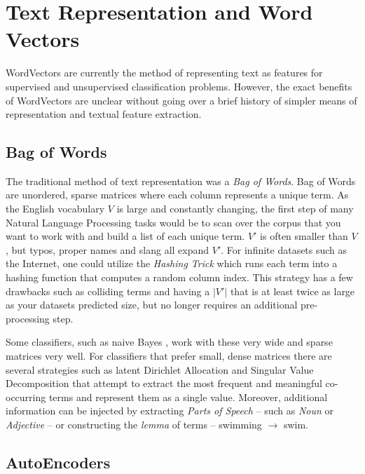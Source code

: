 \section{Text Representation and Word Vectors} \label{sec:wordvectors}

WordVectors \cite{word2vec} are currently the method of representing text as features for supervised and unsupervised classification problems. However, the exact benefits of WordVectors are unclear without going over a brief history of simpler means of representation and textual feature extraction.

\subsection{Bag of Words}

\par{
The traditional method of text representation was a \textit{Bag of Words}. Bag of Words are unordered, sparse matrices where each column represents a unique term. As the English vocabulary $V$ is large and constantly changing, the first step of many Natural Language Processing tasks would be to scan over the corpus that you want to work with and build a list of each unique term. $V'$ is often smaller than $V$, but typos, proper names and slang all expand $V'$. For infinite datasets such as the Internet, one could utilize the \textit{Hashing Trick} \cite{weinberger2009feature} which runs each term into a hashing function that computes a random column index. This strategy has a few drawbacks such as colliding terms and having a $|V'|$ that is at least twice as large as your datasets predicted size, but no longer requires an additional pre-processing step.
}

\par{
Some classifiers, such as naive Bayes \cite{rish2001empirical}, work with these very wide and sparse matrices very well. For classifiers that prefer small, dense matrices there are several strategies such as latent Dirichlet Allocation \cite{blei2003latent} and Singular Value Decomposition \cite{} that attempt to extract the most frequent and meaningful co-occurring terms and represent them as a single value. Moreover, additional information can be injected by extracting \textit{Parts of Speech} -- such as \textit{Noun} or \textit{Adjective} -- or constructing the \textit{lemma} of terms -- swimming $\rightarrow$ swim. 
}

\subsection{AutoEncoders}

